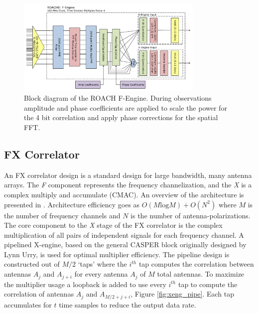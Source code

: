 \documentclass[useAMS,macros,usenatbib]{mn2e}
\begin{document}
\begin{figure}
    \centering
    \includegraphics[width=0.8\textwidth]{graphics/crop_fengine_block.pdf}
    \caption{Block diagram of the ROACH F-Engine. During observations amplitude and phase coefficients are applied to scale the power for the 4 bit correlation and apply phase corrections for the spatial FFT.}
    \label{fig:feng_block}
\end{figure}

\subsection{FX Correlator}
\label{correlator}

An FX correlator design is a standard design for large bandwidth, many antenna arrays.
The \emph{F} component represents the frequency channelization, and the \emph{X} is a complex multiply and accumulate (CMAC).
An overview of the architecture is presented in \cite{romney_white_book}.
Architecture efficiency goes as $O( M \textrm{log} M) + O( N^2)$ where $M$ is the number of frequency channels and $N$ is the number of antenna-polarizations.
The core component to the \emph{X} stage of the FX correlator is the complex multiplication of all pairs of independent signals for each frequency channel.
A pipelined X-engine, based on the general CASPER block originally designed by Lynn Urry\citep{fxcorrelator}, is used for optimal multiplier efficiency.
The pipeline design is constructed out of $M/2$ `taps' where the $i^{th}$ tap computes the correlation between antennas $A_j$ and $A_{j+i}$ for every antenna $A_j$ of $M$ total antennas.
To maximize the multiplier usage a loopback is added to use every $i^{th}$ tap to compute the correlation of antennas $A_j$ and $A_{M/2+j+i}$, Figure \ref{fig:xeng_pipe}.
Each tap accumulates for $t$ time samples to reduce the output data rate.
\end{document}
